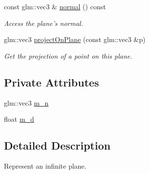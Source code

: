 \begin{DoxyCompactItemize}
const glm\+::vec3 \& \hyperlink{classPlane_afea6480f0bbab2a9ef0c74bd7af5d595}{normal} () const 
\begin{DoxyCompactList}\small\item\em Access the plane's normal. \end{DoxyCompactList}\item 
glm\+::vec3 \hyperlink{classPlane_ac8f889e4cfc5c30a379c516b22cda15b}{project\+On\+Plane} (const glm\+::vec3 \&p)
\begin{DoxyCompactList}\small\item\em Get the projection of a point on this plane. \end{DoxyCompactList}\end{DoxyCompactItemize}
\subsection*{Private Attributes}
\begin{DoxyCompactItemize}
\item 
glm\+::vec3 \hyperlink{classPlane_a47fca7e21a0e825f754182692fad45b0}{m\+\_\+n}
\item 
float \hyperlink{classPlane_a5864bedfa1eb0ff017b89631fc7aff01}{m\+\_\+d}
\end{DoxyCompactItemize}


\subsection{Detailed Description}
Represent an infinite plane. 

